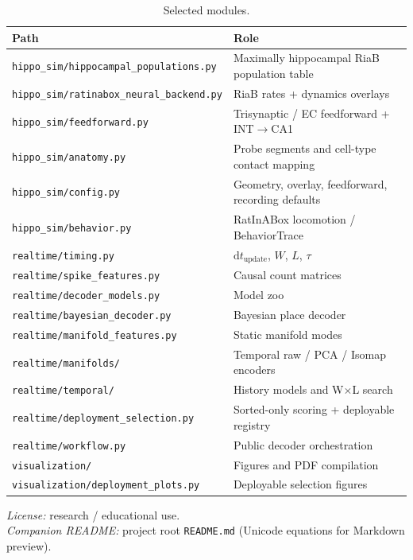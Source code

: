 \documentclass[11pt,a4paper]{article}
\begin{document}
\begin{table}[h]
\centering
\caption{Selected modules.}
\label{tab:modules}
\small
\begin{tabular}{@{}ll@{}}
\toprule
Path & Role \\
\midrule
\texttt{hippo\_sim/hippocampal\_populations.py} & Maximally hippocampal RiaB population table \\
\texttt{hippo\_sim/ratinabox\_neural\_backend.py} & RiaB rates + dynamics overlays \\
\texttt{hippo\_sim/feedforward.py} & Trisynaptic / EC feedforward + INT$\to$CA1 \\
\texttt{hippo\_sim/anatomy.py} & Probe segments and cell-type contact mapping \\
\texttt{hippo\_sim/config.py} & Geometry, overlay, feedforward, recording defaults \\
\texttt{hippo\_sim/behavior.py} & RatInABox locomotion / BehaviorTrace \\
\texttt{realtime/timing.py} & $\mathrm{d}t_{\mathrm{update}}$, $W$, $L$, $\tau$ \\
\texttt{realtime/spike\_features.py} & Causal count matrices \\
\texttt{realtime/decoder\_models.py} & Model zoo \\
\texttt{realtime/bayesian\_decoder.py} & Bayesian place decoder \\
\texttt{realtime/manifold\_features.py} & Static manifold modes \\
\texttt{realtime/manifolds/} & Temporal raw / PCA / Isomap encoders \\
\texttt{realtime/temporal/} & History models and W$\times$L search \\
\texttt{realtime/deployment\_selection.py} & Sorted-only scoring + deployable registry \\
\texttt{realtime/workflow.py} & Public decoder orchestration \\
\texttt{visualization/} & Figures and PDF compilation \\
\texttt{visualization/deployment\_plots.py} & Deployable selection figures \\
\bottomrule
\end{tabular}
\end{table}

\vspace{1em}
\noindent\textit{License:} research / educational use.\\
\noindent\textit{Companion README:} project root \texttt{README.md} (Unicode equations for Markdown preview).
\end{document}

